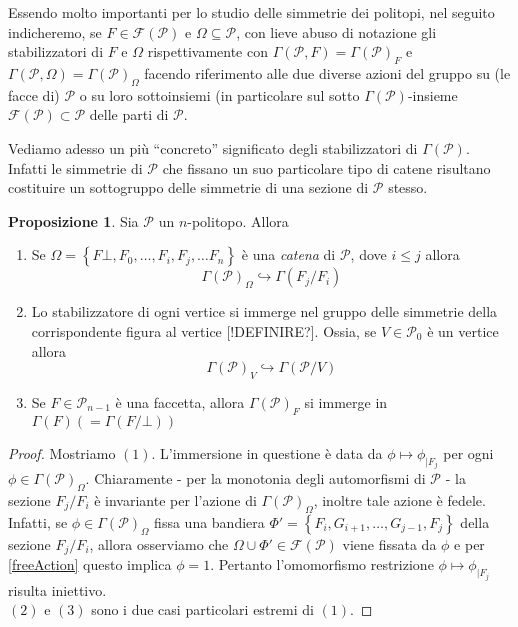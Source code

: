 \documentclass[a4paper,12pt]{report}
\newcommand{\p}{\mathcal{P}}
\theoremstyle{plain}
\theoremstyle{definition}
\newtheorem{prop}[teo]{Proposizione}
\begin{document}
Essendo molto importanti per lo studio delle simmetrie dei politopi, nel seguito indicheremo, se $F\in\mathcal{F}(\p)$ e
$\Omega\subseteq\p$, con lieve abuso di notazione gli stabilizzatori di $F$ e $\Omega$ rispettivamente con $\Gamma(\p,F)=\Gamma(\p)_F$ e
$\Gamma(\p,\Omega)=\Gamma(\p)_\Omega$ facendo riferimento alle due diverse azioni del gruppo su (le facce di) $\p$ o su loro sottoinsiemi
(in particolare sul sotto $\Gamma(\p)$-insieme $\mathcal{F}(\p)\subset\mathcal{P}$ delle parti di $\p$.

Vediamo adesso un pi\`u ``concreto'' significato degli stabilizzatori di $\Gamma(\p)$. Infatti le simmetrie di $\p$ che fissano un suo particolare tipo di
catene risultano costituire un sottogruppo delle simmetrie di una sezione di $\p$ stesso.

\begin{prop}
\label{prop:SectionGroups}
Sia $\p$ un $n$-politopo. Allora
\begin{enumerate}
\item Se $\Omega=\left\{F\bot,F_0,\dots,F_i,F_j,\dots F_n\right\}$ \`e una \emph{catena} di $\p$, dove $i\leq j$ allora
\begin{equation*}
\Gamma(\p)_\Omega\hookrightarrow\Gamma(F_j/F_i)
\end{equation*}
\item Lo stabilizzatore di ogni vertice si immerge nel gruppo delle simmetrie della corrispondente figura al vertice [!DEFINIRE?]. Ossia, se $V\in\p_0$ \`e un vertice allora
\begin{equation*}
\Gamma(\p)_V\hookrightarrow\Gamma(\p/V)
\end{equation*}
\item Se $F\in\p_{n-1}$ \`e una faccetta, allora $\Gamma(\p)_F$ si immerge in $\Gamma(F)(=\Gamma(F/\bot))$
\end{enumerate}
\begin{proof}
Mostriamo $(1)$. L'immersione in questione \`e data da $\phi\mapsto\phi_{\mid F_j}$ per ogni $\phi\in\Gamma(\p)_\Omega$. Chiaramente - per la monotonia degli
automorfismi di $\p$ - la sezione $F_j/F_i$ \`e invariante per l'azione di $\Gamma(\p)_\Omega$,
inoltre tale azione \`e fedele. Infatti, se $\phi\in\Gamma(\p)_\Omega$ fissa una bandiera $\Phi'=\left\{F_i,G_{i+1},\dots,G_{j-1},F_j\right\}$ della sezione
$F_j/F_i$, allora osserviamo che $\Omega\cup\Phi'\in\mathcal{F}(\p)$ viene fissata da $\phi$ e per \ref{freeAction} questo implica $\phi=1$. Pertanto l'omomorfismo restrizione $\phi\mapsto\phi_{\mid F_j}$ risulta iniettivo.\\
$(2)$ e $(3)$ sono i due casi particolari estremi di $(1)$.
\end{proof}
\end{prop}
\end{document}
